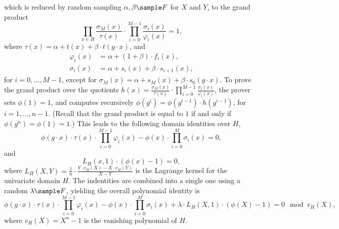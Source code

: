 \documentclass[11pt]{article}
\theoremstyle{definition}
\theoremstyle{remark}
\begin{document}
which is reduced by random sampling $\alpha, \beta\sample F$ for $X$ and $Y$, to the grand product
\begin{equation}
\label{e:UV:lookup:q}
\prod_{x\in H}  \frac{\sigma_{M}(x)}{\tau(x)}\cdot \prod_{i=0}^{M-1} \frac{\sigma_{i}(x)}{\varphi_{i}(x)}   = 1,
\end{equation}
where $\tau(x) = \alpha + t(x) + \beta\cdot t(g\cdot x)$, and 
\begin{align*}
\varphi_i (x) &=\alpha +  (1+\beta)\cdot f_i(x),
\\
\sigma_{i}(x) &= \alpha + s_i(x) + \beta\cdot s_{i+1}(x),
\end{align*}
for $i=0,\ldots, M-1$, except for $\sigma_{M}(x) =  \alpha + s_M(x) + \beta\cdot s_0(g\cdot x)$.
To prove the grand product over the quotients $h(x) =  \frac{\sigma_{M}(x)}{\tau(x)}\cdot \prod_{i=0}^{M-1} \frac{\sigma_{i}(x)}{\varphi_{i}(x)} $, the prover sets $\phi(1) = 1$, and computes recursively $\phi(g^i )= \phi(g^{i-1})\cdot h(g^{i-1})$, for $i=1,\ldots, n-1$.
(Recall that the grand product is equal to $1$ if and only if $\phi(g^n) = \phi(1) = 1$.)
This leads to the following domain identities over $H$,
\begin{equation*}
\phi(g\cdot x) \cdot \tau(x) \cdot \prod_{i=0}^{M-1} \varphi_i (x)
- \phi(x)\cdot \prod_{i=0}^M \sigma_i (x)
= 0,
\end{equation*}
and
\begin{equation*}
L_H(x, 1)\cdot (\phi(x) - 1) = 0,
\end{equation*}
where $L_H(X, Y) = \frac{1}{n}\cdot \frac{Y\cdot v_H(X) - X\cdot v_H(Y)}{X - Y}$ is the Lagrange kernel for the univariate domain $H$.
The indentities are combined into a single one using a random $\lambda \sample F$, yielding the overall polynomial identity is
\begin{equation*}
\phi(g\cdot x) \cdot \tau(x) \cdot \prod_{i=0}^{M-1} \varphi_i (x)
- \phi(x)\cdot \prod_{i=0}^M \sigma_i (x)
+  \lambda \cdot L_H(X, 1)\cdot (\phi(X) - 1) = 0  \mod v_H(X),
\end{equation*}
where $v_H(X) = X^n - 1$ is the vanishing polynomial of $H$.
\end{document}
